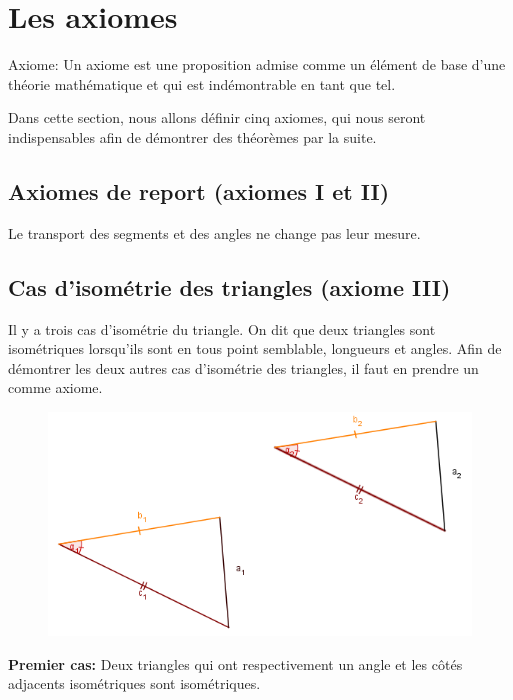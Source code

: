 \documentclass[a4paper,12pt]{article}
\begin{document}
\pagebreak
\section{Les axiomes}
\begin{definition}{Axiome:}
 Un axiome est une proposition admise comme un élément de base d'une théorie mathématique et qui est indémontrable en tant que tel.
\end{definition}

Dans cette section, nous allons définir cinq axiomes, qui nous seront indispensables afin de démontrer des théorèmes par la suite.

\subsection{Axiomes de report (axiomes I et II)}
Le transport des segments et des angles ne change pas leur mesure.

\subsection{Cas d'isométrie des triangles (axiome III)}
Il y a trois cas d'isométrie du triangle. On dit que deux triangles sont isométriques lorsqu'ils sont en tous point semblable, longueurs et angles. Afin de démontrer les deux autres cas d'isométrie des triangles, il faut en prendre un comme axiome.\\

\begin{figure}[H]
    \centering
    \includegraphics[scale=0.6]{axiomes/Cas_1.PNG}
  \end{figure}  
\textbf{Premier cas:} Deux triangles qui ont respectivement un angle et les côtés adjacents isométriques sont isométriques.
\end{document}
